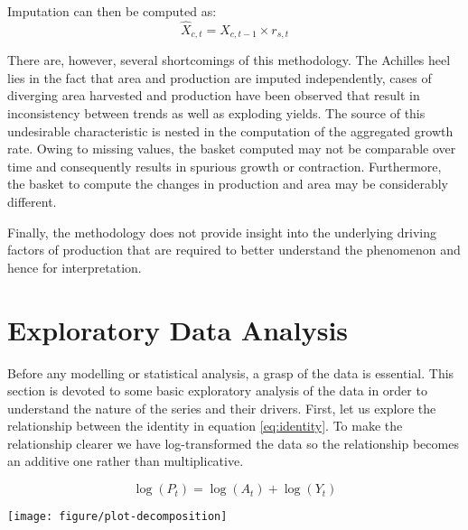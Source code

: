\documentclass[nojss]{jss}\usepackage[]{graphicx}\usepackage[]{color}
\newenvironment{knitrout}{}{} %
\begin{document}
Imputation can then be computed as:
\begin{equation}
  \hat{X}_{c, t} = X_{c, t-1} \times r_{s, t}
\end{equation}
  

There are, however, several shortcomings of this methodology. The
Achilles heel lies in the fact that area and production are imputed
independently, cases of diverging area harvested and production have
been observed that result in inconsistency between trends as well as
exploding yields. The source of this undesirable characteristic is
nested in the computation of the aggregated growth rate. Owing to
missing values, the basket computed may not be comparable over time
and consequently results in spurious growth or
contraction. Furthermore, the basket to compute the changes in
production and area may be considerably different.

Finally, the methodology does not provide insight into the underlying
driving factors of production that are required to better understand
the phenomenon and hence for interpretation.



\section{Exploratory Data Analysis}




Before any modelling or statistical analysis, a grasp of the data is
essential. This section is devoted to some basic exploratory analysis
of the data in order to understand the nature of the series and their
drivers. First, let us explore the relationship between the identity
in equation \ref{eq:identity}. To make the relationship clearer we have
log-transformed the data so the relationship becomes an additive one
rather than multiplicative.

\begin{equation}
  \label{eq:logIdentity}
  \log(P_t) = \log(A_t) + \log(Y_t)
\end{equation}









\begin{knitrout}
\color{fgcolor}

{\centering \texttt{[image: figure/plot-decomposition]} 

}



\end{knitrout}
\end{document}
